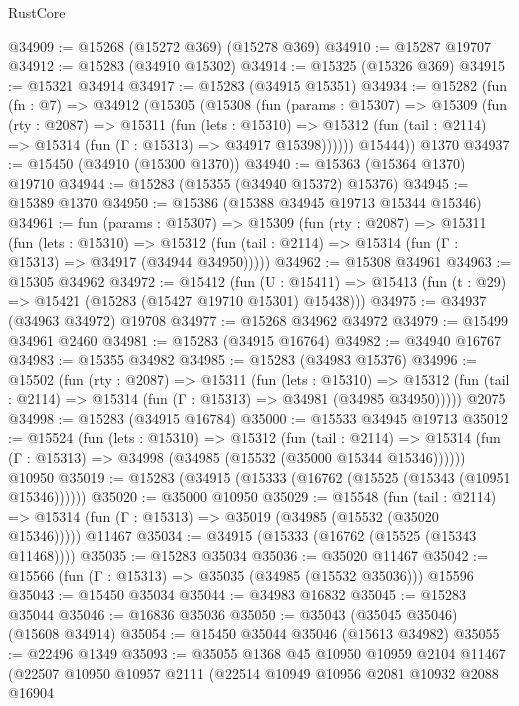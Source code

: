 \begin{lexlean}{RustCore}
\begin{coremodule}
@34909 := @15268 (@15272 @369) (@15278 @369)
@34910 := @15287 @19707
@34912 := @15283 (@34910 @15302)
@34914 := @15325 (@15326 @369)
@34915 := @15321 @34914
@34917 := @15283 (@34915 @15351)
@34934 := @15282
    (fun (fn : @7) =>
    @34912
      (@15305
        (@15308
          (fun (params : @15307) =>
          @15309
            (fun (rty : @2087) =>
            @15311
              (fun (lets : @15310) =>
              @15312 (fun (tail : @2114) => @15314 (fun (Γ : @15313) => @34917 @15398))))))
        @15444))
    @1370
@34937 := @15450 (@34910 (@15300 @1370))
@34940 := @15363 (@15364 @1370) @19710
@34944 := @15283 (@15355 (@34940 @15372) @15376)
@34945 := @15389 @1370
@34950 := @15386 (@15388 @34945 @19713 @15344 @15346)
@34961 := fun (params : @15307) =>
  @15309
    (fun (rty : @2087) =>
    @15311
      (fun (lets : @15310) =>
      @15312 (fun (tail : @2114) => @15314 (fun (Γ : @15313) => @34917 (@34944 @34950)))))
@34962 := @15308 @34961
@34963 := @15305 @34962
@34972 := @15412
    (fun (U : @15411) => @15413 (fun (t : @29) => @15421 (@15283 (@15427 @19710 @15301) @15438)))
@34975 := @34937 (@34963 @34972) @19708
@34977 := @15268 @34962 @34972
@34979 := @15499 @34961 @2460
@34981 := @15283 (@34915 @16764)
@34982 := @34940 @16767
@34983 := @15355 @34982
@34985 := @15283 (@34983 @15376)
@34996 := @15502
    (fun (rty : @2087) =>
    @15311
      (fun (lets : @15310) =>
      @15312 (fun (tail : @2114) => @15314 (fun (Γ : @15313) => @34981 (@34985 @34950)))))
    @2075
@34998 := @15283 (@34915 @16784)
@35000 := @15533 @34945 @19713
@35012 := @15524
    (fun (lets : @15310) =>
    @15312
      (fun (tail : @2114) =>
      @15314 (fun (Γ : @15313) => @34998 (@34985 (@15532 (@35000 @15344 @15346))))))
    @10950
@35019 := @15283 (@34915 (@15333 (@16762 (@15525 (@15343 (@10951 @15346))))))
@35020 := @35000 @10950
@35029 := @15548
    (fun (tail : @2114) => @15314 (fun (Γ : @15313) => @35019 (@34985 (@15532 (@35020 @15346)))))
    @11467
@35034 := @34915 (@15333 (@16762 (@15525 (@15343 @11468))))
@35035 := @15283 @35034
@35036 := @35020 @11467
@35042 := @15566 (fun (Γ : @15313) => @35035 (@34985 (@15532 @35036))) @15596
@35043 := @15450 @35034
@35044 := @34983 @16832
@35045 := @15283 @35044
@35046 := @16836 @35036
@35050 := @35043 (@35045 @35046) (@15608 @34914)
@35054 := @15450 @35044 @35046 (@15613 @34982)
@35055 := @22496 @1349
@35093 := @35055
    @1368
    @45
    @10950
    @10959
    @2104
    @11467
    (@22507
      @10950
      @10957
      @2111
      (@22514
        @10949
        @10956
        @2081
        @10932
        @2088
        @16904

\end{coremodule}
\end{lexlean}
